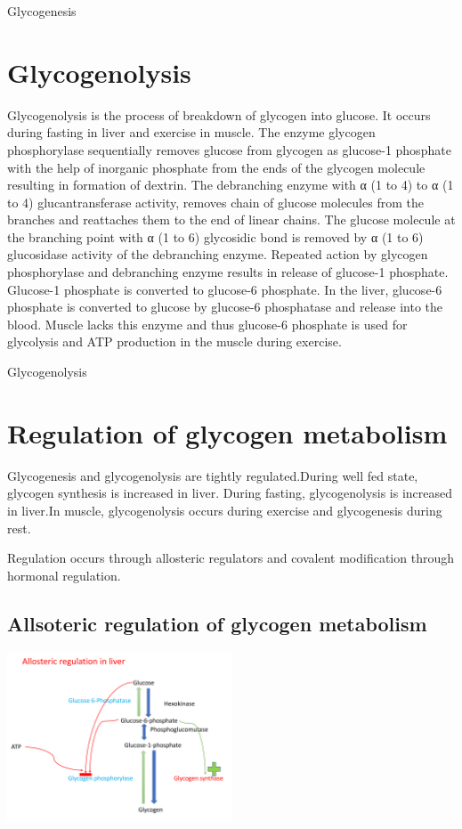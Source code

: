 \documentclass[
]{book}
\begin{document}
Glycogenesis

\section{Glycogenolysis}\label{glycogenolysis}

Glycogenolysis is the process of breakdown of glycogen into glucose. It occurs during fasting in liver and exercise in muscle. The enzyme glycogen phosphorylase sequentially removes glucose from glycogen as glucose-1 phosphate with the help of inorganic phosphate from the ends of the glycogen molecule resulting in formation of dextrin. The debranching enzyme with α (1 to 4) to α (1 to 4) glucantransferase activity, removes chain of glucose molecules from the branches and reattaches them to the end of linear chains. The glucose molecule at the branching point with α (1 to 6) glycosidic bond is removed by α (1 to 6) glucosidase activity of the debranching enzyme. Repeated action by glycogen phosphorylase and debranching enzyme results in release of glucose-1 phosphate. Glucose-1 phosphate is converted to glucose-6 phosphate. In the liver, glucose-6 phosphate is converted to glucose by glucose-6 phosphatase and release into the blood. Muscle lacks this enzyme and thus glucose-6 phosphate is used for glycolysis and ATP production in the muscle during exercise.

Glycogenolysis

\section{Regulation of glycogen metabolism}\label{regulation-of-glycogen-metabolism}

Glycogenesis and glycogenolysis are tightly regulated.During well fed state, glycogen synthesis is increased in liver. During fasting, glycogenolysis is increased in liver.In muscle, glycogenolysis occurs during exercise and glycogenesis during rest.

Regulation occurs through allosteric regulators and covalent modification through hormonal regulation.

\subsection{Allsoteric regulation of glycogen metabolism}\label{allsoteric-regulation-of-glycogen-metabolism}

\includegraphics[width=0.5\textwidth,height=\textheight]{Images/Gly_allo_liver.png}
\end{document}
